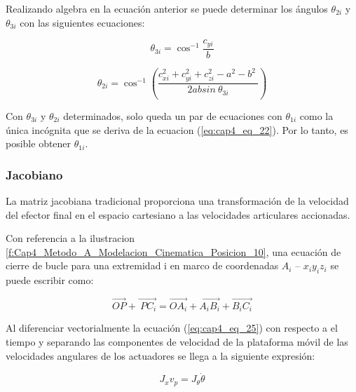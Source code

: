     Realizando algebra en la ecuación anterior se puede determinar los ángulos $\theta_{2i}$ y $\theta_{3i}$ con las siguientes ecuaciones: 
    
    \begin{equation}
       \theta _{3i}= \cos ^{-1}\frac{c_{yi}}{b} 
        \label{eq:cap4_eq_23}
    \end{equation}
     
    \begin{equation}
    \theta _{2i}=\cos ^{-1} \left( \frac{c_{xi}^{2}+c_{yi}^{2}+c_{zi}^{2}-a^{2}-b^{2}~}{2ab sin~ \theta _{3i}} \right) 
     \label{eq:cap4_eq_24}
    \end{equation}
    
    
    Con $\theta _{3i}$ y $\theta_{2i}$ determinados, solo queda un par de ecuaciones con $\theta_{1i}$ como la única incógnita que se deriva de la ecuacion (\ref{eq:cap4_eq_22}). Por lo tanto, es posible obtener  $\theta_{1i}$.

    
        \newpage

        \subsubsection{Jacobiano}\label{ma_jac}
        
        La matriz jacobiana tradicional proporciona una transformación de la velocidad del efector final en el espacio cartesiano a las velocidades articulares accionadas.

        Con referencia a la ilustracion \ref{f:Cap4_Metodo_A_Modelacion_Cinematica_Posicion_10}, una ecuación de cierre de bucle para una extremidad i en marco de coordenadas  \( A_{i} \) – \( x_{i}y_{i}z_{i} \) se puede escribir como:
        
        \begin{equation}
             \overrightarrow{OP}+\overrightarrow{~PC_{i}} =\overrightarrow{OA_{i}}+\overrightarrow{A_{i}B_{i}}+\overrightarrow{B_{i}C_{i}}  
         \label{eq:cap4_eq_25}
        \end{equation}

        Al diferenciar vectorialmente la ecuación (\ref{eq:cap4_eq_25}) con respecto a el tiempo y separando las componentes de velocidad de la plataforma móvil de las velocidades angulares de los actuadores se llega a la siguiente expresión:
        
        \begin{equation}
            J_{x}v_{p}=J_{ \theta }\dot{ \theta } 
            \label{eq:cap4_eq_26}
        \end{equation}
        
